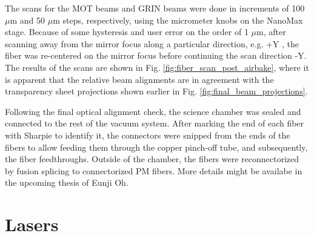 The scans for the MOT beams and GRIN beams were done in increments of 100 $\mu \mathrm{m}$ and 50 $\mu \mathrm{m}$ steps, respectively, using the micrometer knobs on the NanoMax stage. Because of some hysteresis and user error on the order of 1 $\mu \mathrm{m}$, after scanning away from the mirror focus along a particular direction, e.g. +Y , the fiber was re-centered on the mirror focus before continuing the scan direction -Y. The results of the scans are shown in Fig. \ref{fig:fiber_scan_post_airbake}, where it is apparent that the relative beam alignments are in agreement with the transparency sheet projections shown earlier in Fig. \ref{fig:final_beam_projections}. 


Following the final optical alignment check, the science chamber was sealed and connected to the rest of the vacuum system. After marking the end of each fiber with Sharpie to identify it, the connectors were snipped from the ends of the fibers to allow feeding them through the copper pinch-off tube, and subsequently, the fiber feedthroughs. Outside of the chamber, the fibers were reconnectorized by fusion splicing to connectorized PM fibers. More details might be availabe in the upcoming thesis of Eunji Oh.

\section{Lasers}

